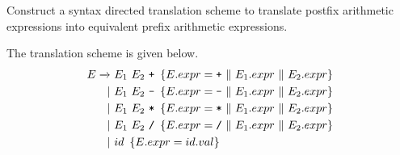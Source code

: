 \begin{exercise}\label{ex:020305}
    Construct a syntax directed translation scheme to translate postfix 
    arithmetic expressions into equivalent prefix arithmetic expressions.
\end{exercise}
\begin{solution}\label{sol:020305}
    The translation scheme is given below.
    \begin{align*}
        E \yld\ &E_1\ E_2\ \texttt{+}\ \cbrak{E.expr = \texttt{+}\ \|\ E_1.expr\ \|\ E_2.expr} \\
             |\ &E_1\ E_2\ \texttt{-}\ \cbrak{E.expr = \texttt{-}\ \|\ E_1.expr\ \|\ E_2.expr} \\
             |\ &E_1\ E_2\ \texttt{*}\ \cbrak{E.expr = \texttt{*}\ \|\ E_1.expr\ \|\ E_2.expr} \\
             |\ &E_1\ E_2\ \texttt{/}\ \cbrak{E.expr = \texttt{/}\ \|\ E_1.expr\ \|\ E_2.expr} \\
             |\ &id\ \cbrak{E.expr = id.val}
    \end{align*}
\end{solution}